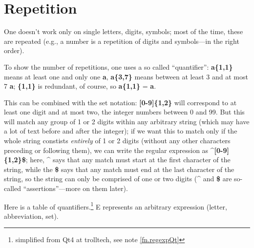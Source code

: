 \section{Repetition}

One doesn't work only on single letters, digits, symbols; most of the time, these are repeated (e.g., a number is a repetition of digits and symbols---in the right order).

To show the number of  repetitions, one uses a so called ``quantifier'': \textbf{a\{1,1\}} means at least one and only one \textbf{a}, \textbf{a\{3,7\}} means between at least 3 and at most 7 \textbf{a}; \textbf{\{1,1\}} is redundant, of course, so \textbf{a\{1,1\}} = \textbf{a}.

This can be combined with the set notation: \textbf{[0-9]\{1,2\}} will correspond to at least one digit and at most two, the integer numbers between 0 and 99. But this will match any group of 1 or 2 digits within any arbitrary string (which may have a lot of text before and after the integer); if we want this to match only if the whole string constists \emph{entirely} of 1 or 2 digits (without any other characters preceding or following them), we can write the regular expression as \textbf{\^{}[0-9]\{1,2\}\$}; here, \textbf{\^{}} says that any match must start at the first character of the string, while the \textbf{\$} says that any match must end at the last character of the string, so the string can only be comprised of one or two digits (\textbf{\^{}} and \textbf{\$} are so-called ``assertions''---more on them later).

Here is a table of quantifiers.\footnote{simplified from Qt4 at trolltech, see note \ref{fn.regexpQt}} E represents an arbitrary expression (letter, abbreviation, set).
\smallskip

